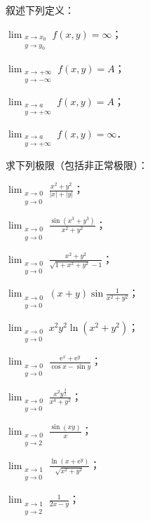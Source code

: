 \begin{xiti}
\item 叙述下列定义：
\begin{ziti}
\item $\displaystyle\lim_{\substack{x\to x_{0}\\ y\to y_{0}}}f(x,y)=\infty$；
\item $\displaystyle\lim_{\substack{x\to+\infty\\ y\to-\infty}}f(x,y)=A$；
\item $\displaystyle\lim_{\substack{x\to a\\ y\to+\infty}}f(x,y)=A$；
\item $\displaystyle\lim_{\substack{x\to a\\ y\to+\infty}}f(x,y)=\infty$．
\end{ziti}
\item 求下列极限（包括非正常极限）：
\begin{ziti}
\item $\displaystyle\lim_{\substack{x\to0\\ y\to0}}\frac{x^{2}+y^{2}}{\left|x\right|+\left|y\right|}$；
\item $\displaystyle\lim_{\substack{x\to0\\ y\to0}}\frac{\sin\left(x^{3}+y^{3}\right)}{x^{2}+y^{2}}$；
\item $\displaystyle\lim_{\substack{x\to0\\ y\to0}}\frac{x^{2}+y^{2}}{\sqrt{1+x^{2}+y^{2}}-1}$；
\item $\displaystyle\lim_{\substack{x\to0\\ y\to0}}(x+y)\sin\frac{1}{x^{2}+y^{2}}$；
\item $\displaystyle\lim_{\substack{x\to0\\ y\to0}}x^{2}y^{2}\ln\left(x^{2}+y^{2}\right)$；
\item $\displaystyle\lim_{\substack{x\to0\\ y\to0}}\frac{\mathrm{e}^{x}+\mathrm{e}^{y}}{\cos x-\sin y}$；
\item $\displaystyle\lim_{\substack{x\to0\\ y\to0}}\frac{x^{2}y^{\frac{3}{2}}}{x^{4}+y^{2}}$；
\item $\displaystyle\lim_{\substack{x\to0\\ y\to2}}\frac{\sin\left(xy\right)}{x}$；
\item $\displaystyle\lim_{\substack{x\to1\\ y\to0}}\frac{\ln\left(x+\mathrm{e}^{y}\right)}{\sqrt{x^{2}+y^{2}}}$；
\item $\displaystyle\lim_{\substack{x\to1\\ y\to2}}\frac{1}{2x-y}$；

\end{ziti}
\end{xiti}
